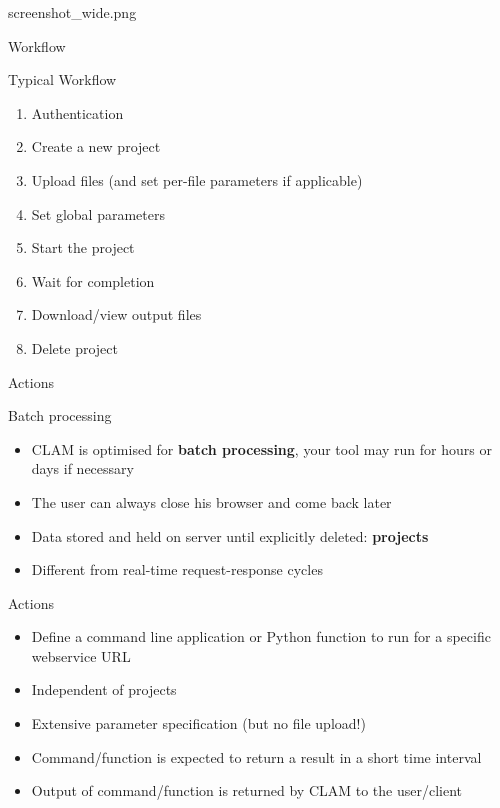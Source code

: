 \documentclass[xcolor=table,10pt,t]{beamer}
\begin{document}
\begin{tussenpagina}{}{}{screenshot_wide.png}
\end{tussenpagina}

\begin{frame}{Workflow}
  \begin{block}{Typical Workflow}
      \begin{enumerate}
        \item Authentication
        \item Create a new project
        \item Upload files (and set per-file parameters if applicable)
        \item Set global parameters
        \item Start the project
        \item Wait for completion
        \item Download/view output files
        \item Delete project
      \end{enumerate}
  \end{block}
\end{frame}



\begin{frame}{Actions}
    \begin{block}{Batch processing}
      \begin{itemize}
        \item CLAM is optimised for \textbf{batch processing}, your tool may run for hours or days if necessary
        \item The user can always close his browser and come back later
        \item Data stored and held on server until explicitly deleted: \textbf{projects}
        \item Different from real-time request-response cycles
      \end{itemize}
    \end{block}

    \begin{block}{Actions}
      \begin{itemize}
        \item Define a command line application or Python function to run for a specific webservice URL
        \item Independent of projects
        \item Extensive parameter specification (but no file upload!)
        \item Command/function is expected to return a result in a short time interval
        \item Output of command/function is returned by CLAM to the user/client
      \end{itemize}
    \end{block}
\end{frame}
\end{document}

